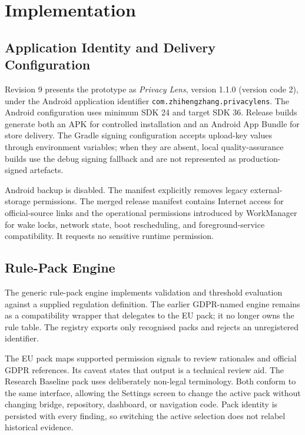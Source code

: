 \section{Implementation}

\subsection{Application Identity and Delivery Configuration}

Revision 9 presents the prototype as \emph{Privacy Lens}, version 1.1.0 (version code 2), under the Android application identifier \texttt{com.zhihengzhang.privacylens}. The Android configuration uses minimum SDK 24 and target SDK 36. Release builds generate both an APK for controlled installation and an Android App Bundle for store delivery. The Gradle signing configuration accepts upload-key values through environment variables; when they are absent, local quality-assurance builds use the debug signing fallback and are not represented as production-signed artefacts.

Android backup is disabled. The manifest explicitly removes legacy external-storage permissions. The merged release manifest contains Internet access for official-source links and the operational permissions introduced by WorkManager for wake locks, network state, boot rescheduling, and foreground-service compatibility. It requests no sensitive runtime permission.

\subsection{Rule-Pack Engine}

The generic rule-pack engine implements validation and threshold evaluation against a supplied regulation definition. The earlier GDPR-named engine remains as a compatibility wrapper that delegates to the EU pack; it no longer owns the rule table. The registry exports only recognised packs and rejects an unregistered identifier.

The EU pack maps supported permission signals to review rationales and official GDPR references. Its caveat states that output is a technical review aid. The Research Baseline pack uses deliberately non-legal terminology. Both conform to the same interface, allowing the Settings screen to change the active pack without changing bridge, repository, dashboard, or navigation code. Pack identity is persisted with every finding, so switching the active selection does not relabel historical evidence.

